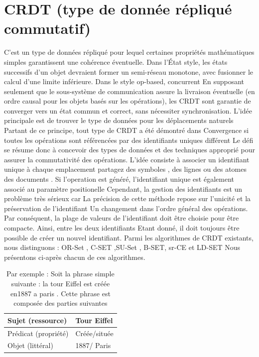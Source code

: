 \documentclass[12pt]{report}
\begin{document}
\section{CRDT (type de donnée répliqué commutatif)}
C'est un type de données répliqué pour lequel certaines propriétés mathématiques simples garantissent une cohérence
éventuelle. Dans l’État style, les états successifs d’un objet devraient former un semi-réseau monotone, avec fusionner le calcul
d’une limite inférieure. Dans le style op-based, concurrent En supposant seulement que le sous-système de communication
assure la livraison éventuelle (en ordre causal pour les objets basés sur les opérations), les CRDT sont garantie de converger
vers un état commun et correct, sans nécessiter synchronisation.
L'idée principale est de trouver le type de données pour les déplacements naturels
Partant de ce principe, tout type de CRDT a été démontré dans Convergence si toutes les opérations sont référencées par des
identifiants uniques différent Le défi se résume donc à concevoir des types de données et des techniques approprié pour
assurer la commutativité des opérations.
\cite{CRDT}
L'idée consiste à associer un identifiant unique à chaque emplacement partagez des symboles , des lignes ou des atomes des
documents . Si l’operation est généré, l'identifiant unique est également associé au paramètre positionelle Cependant, la
gestion des identifiants est un problème très sérieux car La précision de cette méthode repose sur l'unicité et la préservation de
l'identifiant Un changement dans l'ordre général des opérations. Par conséquent, la plage de valeurs de l'identifiant doit être
choisie pour être compacte. Ainsi, entre les deux identifiants Etant donné, il doit toujours être possible de créer un nouvel
identifiant.
Parmi les algorithmes de CRDT existants, nous distinguons : OR-Set , C-SET ,SU-Set , B-SET, sr-CE et LD-SET Nous
présentons ci-après chacun de ces algorithmes.
\begin{table}[h]
\caption{Par exemple : Soit la phrase simple suivante : la tour Eiffel est créée en1887 a paris .
Cette phrase est composée des parties suivantes}
\label{table:crdt-example}
\centering
\begin{tabular}{|l|l|}
\hline
Sujet (ressource)    & Tour Eiffel  \\ \hline
Prédicat (propriété) & Créée/située \\ \hline
Objet (littéral)     & 1887/ Paris  \\ \hline
\end{tabular}
\end{table}
\end{document}

